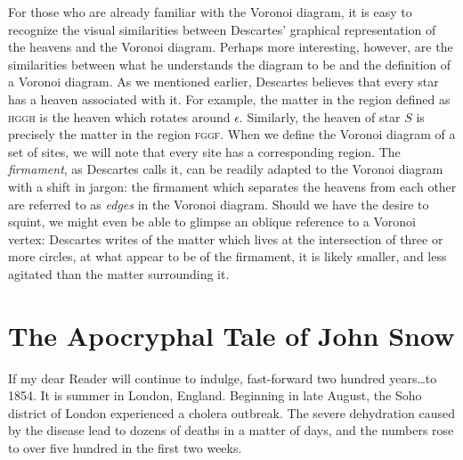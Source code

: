 \documentclass[12pt,twoside]{reedthesis}
\begin{document}
   For those who are already familiar with the Voronoi diagram, it is easy to recognize the visual similarities between Descartes' graphical representation of the heavens and the Voronoi diagram. Perhaps more interesting, however, are the similarities between what he understands the diagram to be and the definition of a Voronoi diagram. As we mentioned earlier, Descartes believes that every star has a heaven associated with it. For example, the matter in the region defined as \textsc{hggh} is the heaven which rotates around $\epsilon$. Similarly, the heaven of star $S$ is precisely the matter in the region \textsc{fggf}. When we define the Voronoi diagram of a set of sites, we will note that every site has a corresponding region. The \emph{firmament}, as Descartes calls it, can be readily adapted to the Voronoi diagram with a shift in jargon: the firmament which separates the heavens from each other are referred to as \emph{edges} in the Voronoi diagram. Should we have the desire to squint, we might even be able to glimpse an oblique reference to a Voronoi vertex: Descartes writes of the matter which lives at the intersection of three or more circles, at what appear to be  of the firmament, it is likely smaller, and less agitated than the matter surrounding it.  
  
  \section{The Apocryphal Tale of John Snow} %
  \label{sec:the_apocryphal_tale_of_john_snow}
    If my dear Reader will continue to indulge, fast-forward two hundred years\ldots to 1854. It is summer in London, England. Beginning in late August, the Soho district of London experienced a cholera outbreak. The severe dehydration caused by the disease lead to dozens of deaths in a matter of days, and the numbers rose to over five hundred in the first two weeks. 
\end{document}
